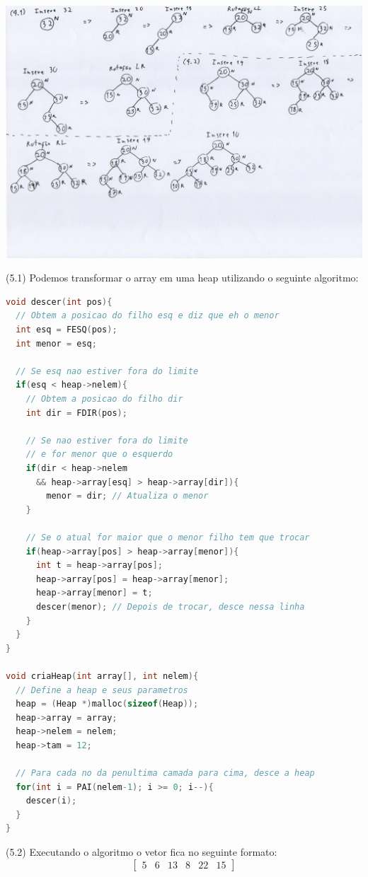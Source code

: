 \documentclass{homework}
\begin{document}
\exercise*
\includegraphics[scale=0.22]{images/q4.pdf}

\exercise
(5.1) Podemos transformar o array em uma heap utilizando o seguinte algoritmo:
\begin{lstlisting}[language=C]
void descer(int pos){
  // Obtem a posicao do filho esq e diz que eh o menor
  int esq = FESQ(pos);
  int menor = esq;
  
  // Se esq nao estiver fora do limite
  if(esq < heap->nelem){
    // Obtem a posicao do filho dir
    int dir = FDIR(pos);
    
    // Se nao estiver fora do limite
    // e for menor que o esquerdo
    if(dir < heap->nelem
      && heap->array[esq] > heap->array[dir]){
        menor = dir; // Atualiza o menor
    }
    
    // Se o atual for maior que o menor filho tem que trocar
    if(heap->array[pos] > heap->array[menor]){
      int t = heap->array[pos];
      heap->array[pos] = heap->array[menor];
      heap->array[menor] = t;
      descer(menor); // Depois de trocar, desce nessa linha
    }
  }
}

void criaHeap(int array[], int nelem){
  // Define a heap e seus parametros
  heap = (Heap *)malloc(sizeof(Heap));
  heap->array = array;
  heap->nelem = nelem;
  heap->tam = 12;
  
  // Para cada no da penultima camada para cima, desce a heap
  for(int i = PAI(nelem-1); i >= 0; i--){
    descer(i);
  }
}
\end{lstlisting}
(5.2) Executando o algoritmo o vetor fica no seguinte formato:
\[
\begin{bmatrix}
5 & 6 & 13 & 8 & 22 & 15
\end{bmatrix}
\]
\end{document}
